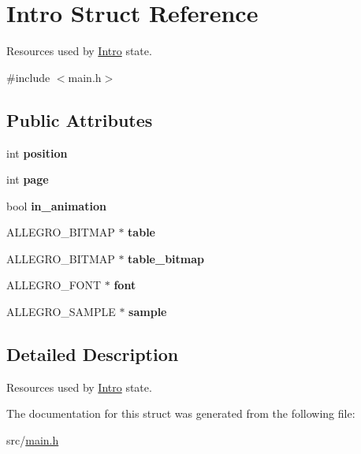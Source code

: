 \hypertarget{structIntro}{\section{\-Intro \-Struct \-Reference}
\label{structIntro}
}


\-Resources used by \hyperlink{structIntro}{\-Intro} state.  




{\ttfamily \#include $<$main.\-h$>$}

\subsection*{\-Public \-Attributes}
\begin{DoxyCompactItemize}
\item 
\hypertarget{structIntro_a5c266b2590d4304f92fd3bad033f4375}{int {\bfseries position}}\label{structIntro_a5c266b2590d4304f92fd3bad033f4375}

\item 
\hypertarget{structIntro_aaea1b2d24c0c9a5437c59d727c79ebd1}{int {\bfseries page}}\label{structIntro_aaea1b2d24c0c9a5437c59d727c79ebd1}

\item 
\hypertarget{structIntro_a2876fd8a7bfd940c3936eb6445984a22}{bool {\bfseries in\-\_\-animation}}\label{structIntro_a2876fd8a7bfd940c3936eb6445984a22}

\item 
\hypertarget{structIntro_a342227f3940dba9ed6b5d3bb4579fd48}{\-A\-L\-L\-E\-G\-R\-O\-\_\-\-B\-I\-T\-M\-A\-P $\ast$ {\bfseries table}}\label{structIntro_a342227f3940dba9ed6b5d3bb4579fd48}

\item 
\hypertarget{structIntro_a77ea358d1f44d69e5477f5dedfc9fd2b}{\-A\-L\-L\-E\-G\-R\-O\-\_\-\-B\-I\-T\-M\-A\-P $\ast$ {\bfseries table\-\_\-bitmap}}\label{structIntro_a77ea358d1f44d69e5477f5dedfc9fd2b}

\item 
\hypertarget{structIntro_a896d4fdd74cf47535173eeaa6e81f734}{\-A\-L\-L\-E\-G\-R\-O\-\_\-\-F\-O\-N\-T $\ast$ {\bfseries font}}\label{structIntro_a896d4fdd74cf47535173eeaa6e81f734}

\item 
\hypertarget{structIntro_a0189475d44f8e19e6fe543371a9daedb}{\-A\-L\-L\-E\-G\-R\-O\-\_\-\-S\-A\-M\-P\-L\-E $\ast$ {\bfseries sample}}\label{structIntro_a0189475d44f8e19e6fe543371a9daedb}

\end{DoxyCompactItemize}


\subsection{\-Detailed \-Description}
\-Resources used by \hyperlink{structIntro}{\-Intro} state. 

\-The documentation for this struct was generated from the following file\-:\begin{DoxyCompactItemize}
\item 
src/\hyperlink{main_8h}{main.\-h}\end{DoxyCompactItemize}
